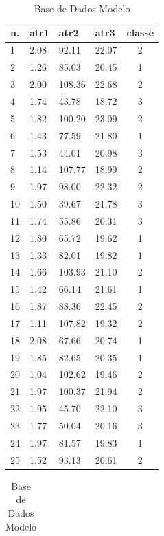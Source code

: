 \begin{table}[!ht]
\centering
\caption{Base de Dados Modelo}
\label{tab:bdm}
\begin{tabular}{|l|l|l|l|c|}
\hline 
 n. & atr1 & atr2 & atr3 & classe \\ \hline
1 & 2.08 & 92.11 & 22.07 & 2 \\ \hline
2 & 1.26 & 85.03 & 20.45 & 1 \\ \hline
3 & 2.00 & 108.36 & 22.68 & 2 \\ \hline
4 & 1.74 & 43.78 & 18.72 & 3 \\ \hline
5 & 1.82 & 100.20 & 23.09 & 2 \\ \hline
6 & 1.43 & 77.59 & 21.80 & 1 \\ \hline
7 & 1.53 & 44.01 & 20.98 & 3 \\ \hline
8 & 1.14 & 107.77 & 18.99 & 2 \\ \hline
9 & 1.97 & 98.00 & 22.32 & 2 \\ \hline
10 & 1.50 & 39.67 & 21.78 & 3 \\ \hline
11 & 1.74 & 55.86 & 20.31 & 3 \\ \hline
12 & 1.80 & 65.72 & 19.62 & 1 \\ \hline
13 & 1.33 & 82.01 & 19.82 & 1 \\ \hline
14 & 1.66 & 103.93 & 21.10 & 2 \\ \hline
15 & 1.42 & 66.14 & 21.61 & 1 \\ \hline
16 & 1.87 & 88.36 & 22.45 & 2 \\ \hline
17 & 1.11 & 107.82 & 19.32 & 2 \\ \hline
18 & 2.08 & 67.66 & 20.74 & 1 \\ \hline
19 & 1.85 & 82.65 & 20.35 & 1 \\ \hline
20 & 1.04 & 102.62 & 19.46 & 2 \\ \hline
21 & 1.97 & 100.37 & 21.94 & 2 \\ \hline
22 & 1.95 & 45.70 & 22.10 & 3 \\ \hline
23 & 1.77 & 50.04 & 20.16 & 3 \\ \hline
24 & 1.97 & 81.57 & 19.83 & 1 \\ \hline
25 & 1.52 & 93.13 & 20.61 & 2 \\ \hline
  \end{tabular}
  \begin{tabular}{ |l|l|l|l|c| }
   

\end{tabular}
\end{table}
